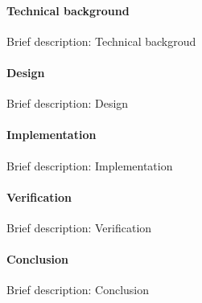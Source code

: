 		\paragraph{Technical background}

Brief description: Technical backgroud

		\paragraph{Design}

Brief description: Design

		\paragraph{Implementation}

Brief description: Implementation

		\paragraph{Verification}

Brief description: Verification

		\paragraph{Conclusion}

Brief description: Conclusion

